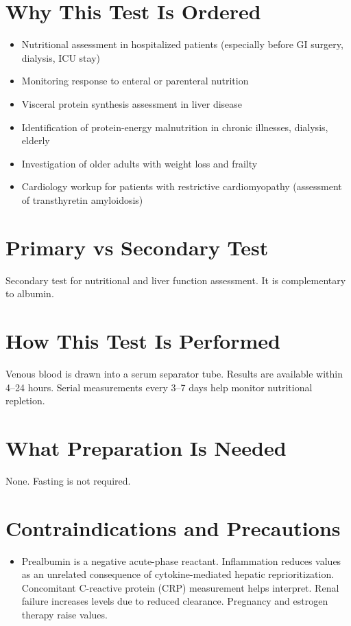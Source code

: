 \section*{Why This Test Is Ordered}
\begin{itemize}
  \item Nutritional assessment in hospitalized patients (especially before GI surgery, dialysis, ICU stay)
  \item Monitoring response to enteral or parenteral nutrition
  \item Visceral protein synthesis assessment in liver disease
  \item Identification of protein-energy malnutrition in chronic illnesses, dialysis, elderly
  \item Investigation of older adults with weight loss and frailty
  \item Cardiology workup for patients with restrictive cardiomyopathy (assessment of transthyretin amyloidosis) \cite{conceicao2016redflag}
\end{itemize}

\section*{Primary vs Secondary Test}
Secondary test for nutritional and liver function assessment. It is complementary to albumin.

\section*{How This Test Is Performed}
Venous blood is drawn into a serum separator tube. Results are available within 4--24 hours. Serial measurements every 3--7 days help monitor nutritional repletion.

\section*{What Preparation Is Needed}
None. Fasting is not required.

\section*{Contraindications and Precautions}
\begin{itemize}
  \item Prealbumin is a negative acute-phase reactant. Inflammation reduces values as an unrelated consequence of cytokine-mediated hepatic reprioritization. Concomitant C-reactive protein (CRP) measurement helps interpret. Renal failure increases levels due to reduced clearance. Pregnancy and estrogen therapy raise values.
\end{itemize}
